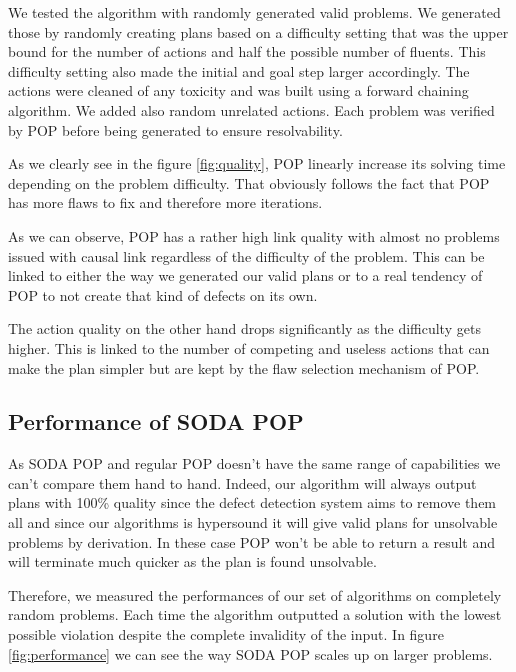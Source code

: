 \documentclass[]{article}
\begin{document}
We tested the algorithm with randomly generated valid problems. We
generated those by randomly creating plans based on a difficulty setting
that was the upper bound for the number of actions and half the possible
number of fluents. This difficulty setting also made the initial and
goal step larger accordingly. The actions were cleaned of any toxicity
and was built using a forward chaining algorithm. We added also random
unrelated actions. Each problem was verified by POP before being
generated to ensure resolvability.

As we clearly see in the figure \ref{fig:quality}, POP linearly increase
its solving time depending on the problem difficulty. That obviously
follows the fact that POP has more flaws to fix and therefore more
iterations.

As we can observe, POP has a rather high link quality with almost no
problems issued with causal link regardless of the difficulty of the
problem. This can be linked to either the way we generated our valid
plans or to a real tendency of POP to not create that kind of defects on
its own.

The action quality on the other hand drops significantly as the
difficulty gets higher. This is linked to the number of competing and
useless actions that can make the plan simpler but are kept by the flaw
selection mechanism of POP.

\subsection{Performance of SODA POP}\label{performance-of-soda-pop}

As SODA POP and regular POP doesn't have the same range of capabilities
we can't compare them hand to hand. Indeed, our algorithm will always
output plans with 100\% quality since the defect detection system aims
to remove them all and since our algorithms is hypersound it will give
valid plans for unsolvable problems by derivation. In these case POP
won't be able to return a result and will terminate much quicker as the
plan is found unsolvable.

Therefore, we measured the performances of our set of algorithms on
completely random problems. Each time the algorithm outputted a solution
with the lowest possible violation despite the complete invalidity of
the input. In figure \ref{fig:performance} we can see the way SODA POP
scales up on larger problems.
\end{document}
